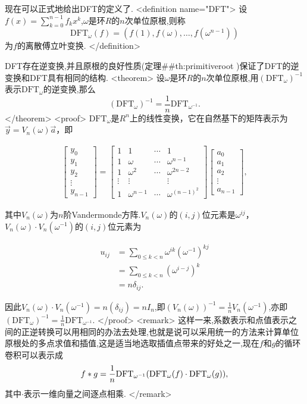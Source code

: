 \documentclass{ctexart}
\begin{document}
现在可以正式地给出DFT的定义了.
<definition  name="DFT">
设$f(x)=\sum\limits_{k=0}^{n-1}f_kx^k$,$\omega$是环$R$的$n$次单位原根,则称$$\mathrm{DFT}_{\omega}(f)=(f(1),f(\omega),\ldots,f(\omega^{n-1}))$$为$f$的离散傅立叶变换.
</definition>

DFT存在逆变换,并且原根的良好性质(定理##th:primitiveroot )保证了DFT的逆变换和DFT具有相同的结构.
<theorem>
设$\omega$是环$R$的$n$次单位原根,用$(\mathrm{DFT}_\omega)^{-1}$表示$\mathrm{DFT}_\omega$的逆变换,那么$$(\mathrm{DFT}_\omega)^{-1}=\frac{1}{n}\mathrm{DFT}_{\omega^{-1}}.$$
</theorem>
<proof>
$\mathrm{DFT}_\omega$是$R^n$上的线性变换，它在自然基下的矩阵表示为$\vec{y}=V_n(\omega)\vec{a}$，即

\begin{align*}
\begin{bmatrix}
y_0\\
y_1\\
y_2\\
\vdots\\
y_{n-1}
\end{bmatrix}
=
\begin{bmatrix}
1 & 1 & \cdots & 1\\
1 & \omega & \cdots & \omega^{n-1}\\
1 & \omega^2 & \cdots & \omega^{2n-2}\\
\vdots & \vdots & & \vdots\\
1 & \omega^{n-1} & \cdots & \omega^{(n-1)^2}
\end{bmatrix}
\begin{bmatrix}
a_0\\
a_1\\
a_2\\
\vdots\\
a_{n-1}
\end{bmatrix},
\end{align*}

其中$V_n(\omega)$为$n$阶Vandermonde方阵.$V_n(\omega)$的$(i, j)$位元素是$\omega^{ij}$，$V_n(\omega)\cdot V_n(\omega^{-1})$的$(i, j)$位元素为

\begin{align*}
u_{ij}&=\sum_{0\le k<n}\omega^{ik}(\omega^{-1})^{kj}\\
&=\sum_{0\le k<n}(\omega^{i-j})^k\\
&=n\delta_{ij}.
\end{align*}

因此$V_n(\omega)\cdot V_n(\omega^{-1})=n(\delta_{ij})=nI_n$,即$(V_n(\omega))^{-1}=\frac{1}{n}V_n(\omega^{-1})$,亦即$(\mathrm{DFT}_\omega)^{-1}=\frac{1}{n}\mathrm{DFT}_{\omega^{-1}}$.
</proof>
<remark>
这样一来,系数表示和点值表示之间的正逆转换可以用相同的办法去处理,也就是说可以采用统一的方法来计算单位原根处的多点求值和插值,这是适当地选取插值点带来的好处之一,现在$f$和$g$的循环卷积可以表示成$$f*g={1\over n}\mathrm{DFT}_{\omega^{-1}}(\mathrm{DFT}_\omega(f)\cdot \mathrm{DFT}_\omega(g)),$$其中$\cdot$表示一维向量之间逐点相乘.
</remark>
\end{document}
